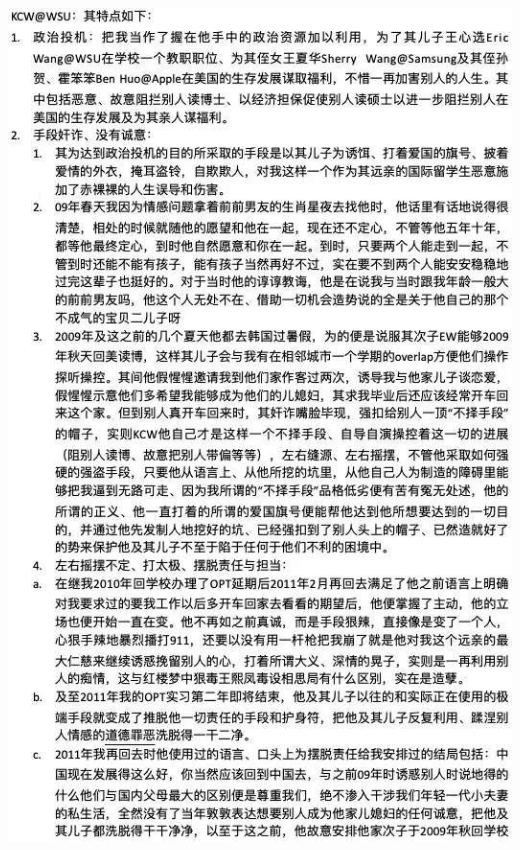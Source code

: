 \documentclass[9pt, b5paper]{article}
\begin{document}
\begin{center}
\includegraphics[width=.9\linewidth]{./pic/1.jpg}
\end{center}
\end{document}
